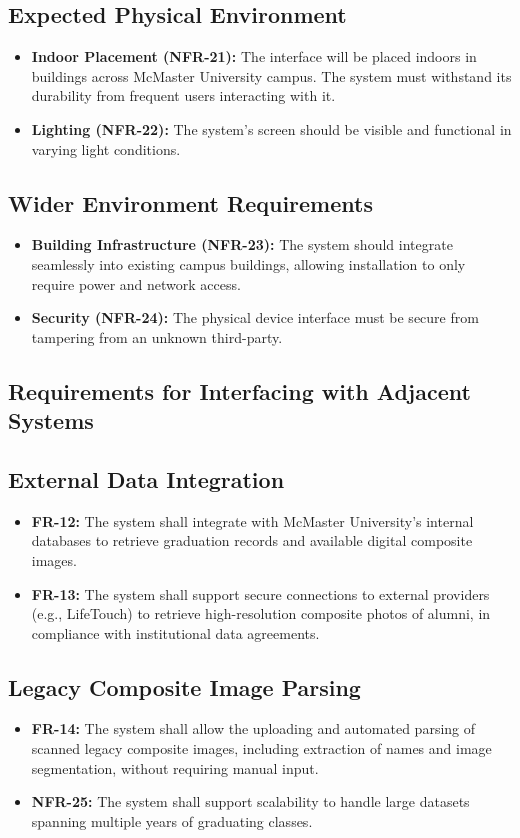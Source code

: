 \documentclass[12pt]{article}
\begin{document}
\subsection{Expected Physical Environment}
\begin{itemize}
    \item \textbf{Indoor Placement (NFR-21):} The interface will be placed indoors in buildings across McMaster University campus. The system must withstand its durability from frequent users interacting with it.
    \item \textbf{Lighting (NFR-22):} The system’s screen should be visible and functional in varying light conditions.
\end{itemize}

\subsection{Wider Environment Requirements}
\begin{itemize}
    \item \textbf{Building Infrastructure (NFR-23):} The system should integrate seamlessly into existing campus buildings, allowing installation to only require power and network access.
    \item \textbf{Security (NFR-24):} The physical device interface must be secure from tampering from an unknown third-party.
\end{itemize}

\subsection{Requirements for Interfacing with Adjacent Systems}

\subsection*{External Data Integration}
\begin{itemize}
    \item \textbf{FR-12:} The system shall integrate with McMaster University’s internal databases to retrieve graduation records and available digital composite images.
    \item \textbf{FR-13:} The system shall support secure connections to external providers (e.g., LifeTouch) to retrieve high-resolution composite photos of alumni, in compliance with institutional data agreements.
\end{itemize}

\subsection*{Legacy Composite Image Parsing}
\begin{itemize}
    \item \textbf{FR-14:} The system shall allow the uploading and automated parsing of scanned legacy composite images, including extraction of names and image segmentation, without requiring manual input.
    \item \textbf{NFR-25:} The system shall support scalability to handle large datasets spanning multiple years of graduating classes.
\end{itemize}
\end{document}

